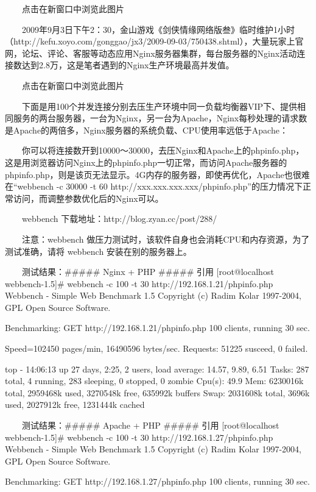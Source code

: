 　　点击在新窗口中浏览此图片

　　2009年9月3日下午2：30，金山游戏《剑侠情缘网络版叁》临时维护1小时（http://kefu.xoyo.com/gonggao/jx3/2009-09-03/750438.shtml），大量玩家上官网，论坛、评论、客服等动态应用Nginx服务器集群，每台服务器的Nginx活动连接数达到2.8万，这是笔者遇到的Nginx生产环境最高并发值。

　　点击在新窗口中浏览此图片


　　下面是用100个并发连接分别去压生产环境中同一负载均衡器VIP下、提供相同服务的两台服务器，一台为Nginx，另一台为Apache，Nginx每秒处理的请求数是Apache的两倍多，Nginx服务器的系统负载、CPU使用率远低于Apache：

　　你可以将连接数开到10000～30000，去压Nginx和Apache上的phpinfo.php，这是用浏览器访问Nginx上的phpinfo.php一切正常，而访问Apache服务器的phpinfo.php，则是该页无法显示。4G内存的服务器，即使再优化，Apache也很难在“webbench -c 30000 -t 60 http://xxx.xxx.xxx.xxx/phpinfo.php”的压力情况下正常访问，而调整参数优化后的Nginx可以。

　　webbench 下载地址：http://blog.zyan.cc/post/288/

　　注意：webbench 做压力测试时，该软件自身也会消耗CPU和内存资源，为了测试准确，请将 webbench 安装在别的服务器上。

　　测试结果：##### Nginx + PHP #####
引用
[root@localhost webbench-1.5]# webbench -c 100 -t 30 http://192.168.1.21/phpinfo.php
Webbench - Simple Web Benchmark 1.5
Copyright (c) Radim Kolar 1997-2004, GPL Open Source Software.

Benchmarking: GET http://192.168.1.21/phpinfo.php
100 clients, running 30 sec.

Speed=102450 pages/min, 16490596 bytes/sec.
Requests: 51225 susceed, 0 failed.

top - 14:06:13 up 27 days,  2:25,  2 users,  load average: 14.57, 9.89, 6.51
Tasks: 287 total,   4 running, 283 sleeping,   0 stopped,   0 zombie
Cpu(s): 49.9%
Mem:   6230016k total,  2959468k used,  3270548k free,   635992k buffers
Swap:  2031608k total,     3696k used,  2027912k free,  1231444k cached


　　测试结果：#####  Apache + PHP #####
引用
[root@localhost webbench-1.5]# webbench -c 100 -t 30 http://192.168.1.27/phpinfo.php
Webbench - Simple Web Benchmark 1.5
Copyright (c) Radim Kolar 1997-2004, GPL Open Source Software.

Benchmarking: GET http://192.168.1.27/phpinfo.php
100 clients, running 30 sec.

